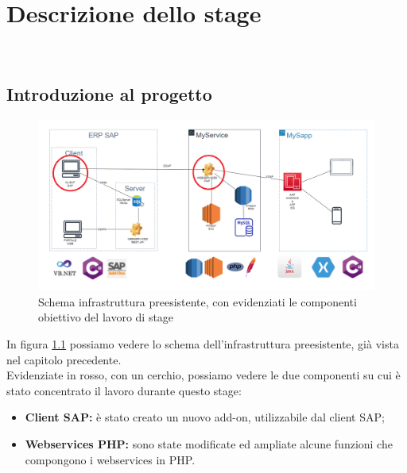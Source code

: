 
\chapter{Descrizione dello stage}
\label{cap:descrizione-stage}

\\

\section{Introduzione al progetto}
\begin{figure}[!h] 
	\centering 
	\includegraphics[scale = 0.5]{immagini/obiettivi-stage.png} 
	\caption{Schema infrastruttura preesistente, con evidenziati le componenti obiettivo del lavoro di stage}
	\label{fig:3-1}
\end{figure}
\newpage

	In figura \ref{fig:3-1} possiamo vedere lo schema dell'infrastruttura preesistente, già vista nel capitolo precedente.\\
	Evidenziate in rosso, con un cerchio, possiamo vedere le due componenti su cui è stato concentrato il lavoro durante questo stage:


\begin{itemize}
	\item \textbf{Client SAP:} è stato creato un nuovo add-on, utilizzabile dal client SAP;
	\item \textbf{Webservices PHP:} sono state modificate ed ampliate alcune funzioni che compongono i webservices in PHP.
\end{itemize}
